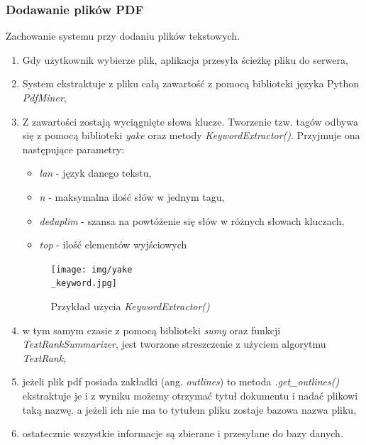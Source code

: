 \documentclass[12pt,a4paper,twoside]{article}
\begin{document}
\subsubsection{Dodawanie plików PDF}
Zachowanie systemu przy dodaniu plików tekstowych.
\begin{enumerate}
	\item Gdy użytkownik wybierze plik, aplikacja przesyła ścieżkę pliku do serwera,
	\item System ekstraktuje z pliku całą zawartość z pomocą biblioteki języka Python \textit{PdfMiner},
	\item Z zawartości zostają wyciągnięte słowa klucze. Tworzenie tzw. tagów odbywa się z pomocą biblioteki \textit{yake} oraz metody \textit{KeywordExtractor()}. Przyjmuje ona następujące parametry:
	\begin{itemize}
		\item \textit{lan} - język danego tekstu,
		\item \textit{n} - maksymalna ilość słów w jednym tagu,
		\item \textit{deduplim} - szansa na powtóżenie się słów w różnych słowach kluczach,
		\item \textit{top} - ilość elementów wyjściowych
	\end{itemize}
	\begin{figure}[h]
		\centering
  		\texttt{[image: img/yake\\\_keyword.jpg]}
  		\caption{Przykład użycia \textit{KeywordExtractor()}}
	\end{figure}
	\item w tym samym czasie z pomocą biblioteki \textit{sumy} oraz funkcji \textit{TextRankSummarizer}, jest tworzone streszczenie z użyciem algorytmu \textit{TextRank},
	\item jeżeli plik pdf posiada zakładki (ang. \textit{outlines}) to metoda \textit{.get\_outlines()} ekstraktuje je i z wyniku możemy otrzymać tytuł dokumentu i nadać plikowi taką nazwę. a jeżeli ich nie ma to tytułem pliku zostaje bazowa nazwa pliku,
	\item ostatecznie wszystkie informacje są zbierane i przesyłane do bazy danych.
\end{enumerate}
\end{document}
